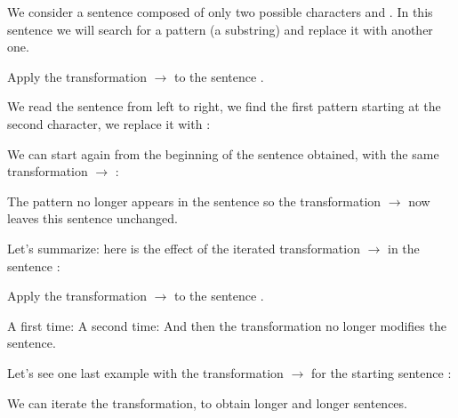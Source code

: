 \documentclass[11pt,class=report,crop=false]{standalone}
\begin{document}
\begin{cours}

We consider a \og{}sentence\fg{} composed of only two possible characters 
\rzero{} and \run. In this sentence we will search for a pattern (a substring) and replace it with another one.

\begin{exemple}
Apply the transformation \rzero\run{} $\rightarrow$ \run\rzero{}
to the sentence \run\rzero\run\run\rzero.

We read the sentence from left to right, we find the first pattern \rzero\run{} starting at the second character, we replace it with \run\rzero{}:
\mycenterline{\run(\rzero\run)\run\rzero{} \quad $\longmapsto$ \quad \run(\run\rzero)\run\rzero}

We can start again from the beginning of the sentence obtained, with the same transformation \rzero\run{} $\rightarrow$ \run\rzero{}:
\mycenterline{\run\run(\rzero\run)\rzero{} \quad $\longmapsto$ \quad \run\run(\run\rzero)\rzero}

The pattern \rzero\run{} no longer appears in the sentence \run\run\run\rzero\rzero{} so
the transformation \rzero\run{} $\rightarrow$\run\rzero{} now leaves this sentence unchanged.

Let's summarize: here is the effect of the iterated transformation \rzero\run{} $\rightarrow$ \run\rzero{} in the sentence \run\rzero\run\run\rzero{}:
\mycenterline{\run\rzero\run\run\rzero{} \quad $\longmapsto$ \quad \run\run\rzero\run\rzero{} \quad $\longmapsto$ \quad \run\run\run\rzero\rzero}
\end{exemple}

\begin{exemple}
Apply the transformation \rzero\rzero\run{} $\rightarrow$\run\run\rzero\rzero{}
to the sentence \rzero\rzero\run\run.

A first time:
\mycenterline{(\rzero\rzero\run)\run{} \quad $\longmapsto$ \quad (\run\run\rzero\rzero)\run}
A second time:
\mycenterline{\run\run(\rzero\rzero\run) \quad $\longmapsto$ \quad \run\run(\run\run\rzero\rzero)}
And then the transformation no longer modifies the sentence.
\end{exemple}

\begin{exemple}
Let's see one last example with the transformation \rzero\run{} $\rightarrow$\run\run\rzero\rzero{} for the starting sentence \rzero\rzero\rzero\run{}: 
\mycenterline{
\rzero\rzero\rzero\run{} \quad $\longmapsto$ \quad 
\rzero\rzero\run\run\rzero\rzero{} \quad $\longmapsto$ \quad 
\rzero\run\run\rzero\rzero\run\rzero\rzero{} \quad $\longmapsto$ \quad 
\run\run\rzero\rzero\run\rzero\rzero\run\rzero\rzero{} \quad $\longmapsto$ \quad $\cdots$}

We can iterate the transformation, to obtain longer and longer sentences.
\end{exemple}


\end{cours}
\end{document}
